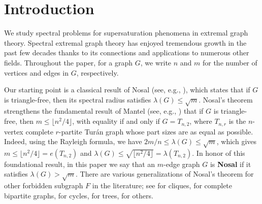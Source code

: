 \documentclass[11pt,a4paper]{article}
\theoremstyle{definition}
\theoremstyle{remark}
\begin{document}




\section{Introduction} 
We study spectral problems for supersaturation phenomena in extremal graph theory. Spectral extremal graph theory has enjoyed tremendous growth in the past few decades thanks to its connections and applications 
to numerous other fields. Throughout the paper, for a graph $G$, we write $n$ and $m$ for the number of vertices and edges in $G$, respectively.

Our starting point is a classical result of Nosal \cite{Nos1970} (see, e.g., \cite{Niki2002}), which states
that if $G$ is triangle-free, then its spectral radius satisfies $\lambda(G) \le \sqrt{m}.$
Nosal's theorem strengthens the fundamental result of Mantel (see, e.g., \cite{Bol1978}) that 
if $G$ is triangle-free, then $m\le \lfloor n^2/4\rfloor$, 
with equality if and only if $G=T_{n,2}$, where $T_{n,r}$ is the $n$-vertex complete $r$-partite Tur\'an graph whose part sizes are as equal as possible. Indeed, using the Rayleigh formula, 
we have $ 2m/n \le \lambda (G) \le \sqrt{m}$, which gives  
$m \le \lfloor n^2/4\rfloor = e(T_{n,2})$ and 
$\lambda (G)\le \sqrt{\lfloor n^2/4\rfloor} = \lambda (T_{n,2})$. 
In honor of this foundational result, in this paper we say that an $m$-edge graph $G$ is \textbf{Nosal} if  it satisfies $\lambda(G) > \sqrt{m}.$
There are various generalizations of Nosal's theorem for other forbidden subgraph $F$ in the literature; see \cite{Niki2002,BN2007,LNW2021,Zhang2024} for cliques, 
\cite{BG2009,Niki2010laa} for complete bipartite graphs,
 \cite{CDT2024,LZS2024,LN2023,Zhang-wq-2024} for cycles, 
 \cite{CDT2023,FLSZ2024} for trees, 
 \cite{CFTZ20, ZLX2022,Niki2009cpc,LLP2024-AAM,LFP2024-triangular} for others. 
 
\end{document}

